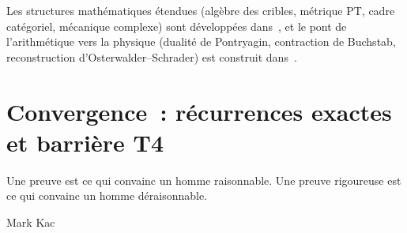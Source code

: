 \documentclass[12pt,a4paper]{article}
\begin{document}
Les structures mathématiques étendues (algèbre des cribles, métrique
PT, cadre catégoriel, mécanique complexe) sont développées
dans~\cite{companion_M4}, et le pont de l'arithmétique vers la
physique (dualité de Pontryagin, contraction de Buchstab,
reconstruction d'Osterwalder--Schrader) est construit
dans~\cite{companion_M5}.


\newpage

\section{Convergence~: récurrences exactes et barrière T4}
\label{sec:convergence}

\epigraph{Une preuve est ce qui convainc un homme raisonnable. Une
preuve rigoureuse est ce qui convainc un homme déraisonnable.}{Mark
Kac}
\end{document}
